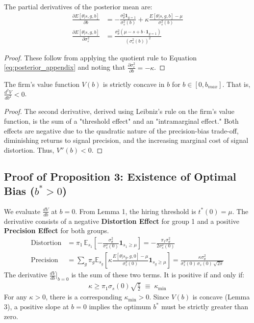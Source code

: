 \begin{lemma}
The partial derivatives of the posterior mean are:
\begin{align}
\frac{\partial E[\theta | s, g, b]}{\partial b} &= -\frac{\sigma_\theta^2 \mathbf{1}_{g=1}}{\sigma_s^2(b)} + \kappa \frac{E[\theta|s,g,b] - \mu}{\sigma_s^2(b)} \\
\frac{\partial E[\theta | s, g, b]}{\partial \sigma_\varepsilon^2} &= \frac{\sigma_\theta^2(\mu - s + b \cdot \mathbf{1}_{g=1})}{(\sigma_s^2(b))^2}
\end{align}
\end{lemma}
\begin{proof}
These follow from applying the quotient rule to Equation \ref{eq:posterior_appendix} and noting that $\frac{\partial \sigma_\varepsilon^2}{\partial b} = -\kappa$.
\end{proof}

\begin{lemma}
The firm's value function $V(b)$ is strictly concave in $b$ for $b \in [0, b_{max}]$. That is, $\frac{d^2V}{db^2} < 0$.
\end{lemma}
\begin{proof}
The second derivative, derived using Leibniz's rule on the firm's value function, is the sum of a "threshold effect" and an "intramarginal effect." Both effects are negative due to the quadratic nature of the precision-bias trade-off, diminishing returns to signal precision, and the increasing marginal cost of signal distortion. Thus, $V''(b) < 0$.
\end{proof}

\subsection{Proof of Proposition 3: Existence of Optimal Bias ($b^* > 0$)}

We evaluate $\frac{dV}{db}$ at $b=0$. From Lemma 1, the hiring threshold is $t^*(0)=\mu$. The derivative consists of a negative \textbf{Distortion Effect} for group 1 and a positive \textbf{Precision Effect} for both groups.
\begin{align}
\text{Distortion} &= \pi_1 \, \mathbb{E}_{s_1}\left[-\frac{\sigma_\theta^2}{\sigma_s^2(0)} \mathbf{1}_{s_1 \ge \mu}\right] = -\frac{\pi_1 \sigma_\theta^2}{2\sigma_s^2(0)} \\
\text{Precision} &= \sum_g \pi_g \mathbb{E}_{s_g}\left[ \kappa \frac{E[\theta|s_g,g,0]-\mu}{\sigma_s^2(0)} \mathbf{1}_{s_g \ge \mu} \right] = \frac{\kappa \sigma_\theta^2}{\sigma_s^2(0)\,\sigma_s(0)\,\sqrt{2\pi}}
\end{align}
The derivative $\frac{dV}{db}\Big|_{b=0}$ is the sum of these two terms. It is positive if and only if:
\begin{align}
\kappa \geq \pi_1 \sigma_s(0) \sqrt{\tfrac{\pi}{2}} \;\equiv\; \kappa_{\min}
\end{align}
For any $\kappa > 0$, there is a corresponding $\kappa_{\min}>0$. Since $V(b)$ is concave (Lemma 3), a positive slope at $b=0$ implies the optimum $b^*$ must be strictly greater than zero.

